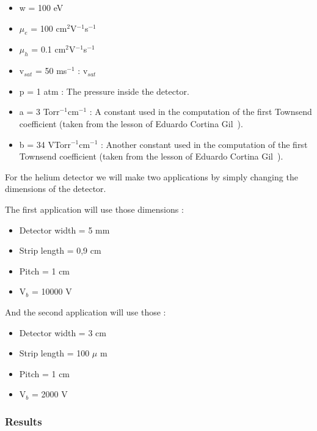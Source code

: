 \documentclass[11pt]{article}
\begin{document}
				\begin{itemize}

					\item w = 100 eV
					\item $\mu_e$ = 100 cm$^2$V$^{-1}$s$^{-1}$
					\item $\mu_h$ = 0.1 cm$^2$V$^{-1}$s$^{-1}$
					\item v$_{sat}$ = 50 ms$^{-1}$ : v$_{sat}$
					\item p = 1 atm : The pressure inside the detector.
					\item a = 3 Torr$^{-1}$cm$^{-1}$ : A constant used in the computation of the first
						Townsend coefficient (taken from the lesson of Eduardo Cortina Gil~\cite{lphy2236}).
					\item b = 34 VTorr$^{-1}$cm$^{-1}$ : Another constant used in the computation of the
						first Townsend coefficient (taken from the lesson of Eduardo Cortina Gil~\cite{lphy2236}).

				\end{itemize}

				For the helium detector we will make two applications by simply changing the dimensions of
				the detector.

				The first application will use those dimensions :
				\begin{itemize}

					\item Detector width = 5 mm
					\item Strip length = 0,9 cm
					\item Pitch = 1 cm
					\item V$_b$ = 10000 V

				\end{itemize}

				And the second application will use those :

				\begin{itemize}

					\item Detector width = 3 cm
					\item Strip length = 100 $\mu$ m
					\item Pitch = 1 cm
					\item V$_b$ = 2000 V

				\end{itemize}

			\subsubsection*{Results}
\end{document}
